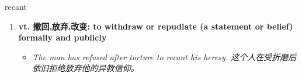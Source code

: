 
\begin{frame}
{\huge recant}
\begin{center}
\begin{enumerate}\Large
  \item \textbf{vt. 撤回,放弃,改变: to withdraw or repudiate (a statement or belief) formally and publicly}
  \begin{itemize}
    \item \em{\Large{The man has refused after torture to recant his heresy. 这个人在受折磨后依旧拒绝放弃他的异教信仰。}}
  \end{itemize}
\end{enumerate}
\end{center}
\end{frame}
